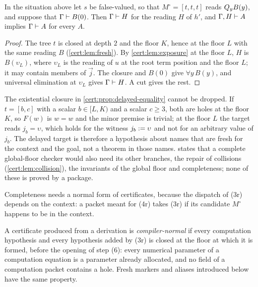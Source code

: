 \begin{proposition}\label{cert:prop:delayed-closure}
In the situation above let $s$ be false-valued, so that $M^{\circ}=[t,t,t]$
reads $Q_{y}B(y)$, and suppose that $\Gamma\vdash B(0)$. Then
$\Gamma\vdash H$ for the reading $H$ of $h'$, and $\Gamma,H\vdash A$ implies
$\Gamma\vdash A$ for every $A$.
\end{proposition}
\begin{proof}
The tree $t$ is closed at depth $2$ and the floor $K$, hence at the floor $L$
with the same reading $B$ (\cref{cert:lem:fresh}). By \cref{cert:lem:exposure}
at the floor $L$, $H$ is $B(\upsilon_L)$, where $\upsilon_L$ is the reading of
$u$ at the root term position and the floor $L$; it may contain members of
$\vec j$. The closure and $B(0)$ give $\forall y\,B(y)$, and universal
elimination at $\upsilon_L$ gives $\Gamma\vdash H$. A cut gives the rest.
\end{proof}

The existential closure in \cref{cert:prop:delayed-equality} cannot be
dropped. If $t=[b,c]$ with a scalar $b\in[L,K)$ and a scalar $c\ge 3$, both
are holes at the floor $K$, so $F(w)$ is $w=w$ and the minor premise is
trivial; at the floor $L$ the target reads $j_b=\upsilon$, which holds for the
witness $j_b\mathrel{:=}\upsilon$ and not for an arbitrary value of $j_b$. The
delayed target is therefore a hypothesis about names that are fresh for the
context and the goal, not a theorem in those names. 
states that a complete global-floor checker would also need its other
branches, the repair of collisions (\cref{cert:lem:collision}), the
invariants of the global floor and completeness; none of these is proved by a
package.

Completeness needs a normal form of certificates, because the dispatch of
(3r) depends on the context: a packet meant for (4r) takes (3r) if its
candidate $M^{\circ}$ happens to be in the context.

\begin{definition}\label{cert:def:compiler-normal}
A certificate produced from a derivation is \emph{compiler-normal} if every
computation hypothesis and every hypothesis added by (3r) is closed at the
floor at which it is formed, before the opening of step (6): every numerical
parameter of a computation equation is a parameter already allocated, and no
field of a computation packet contains a hole. Fresh markers and aliases
introduced below have the same property.
\end{definition}

